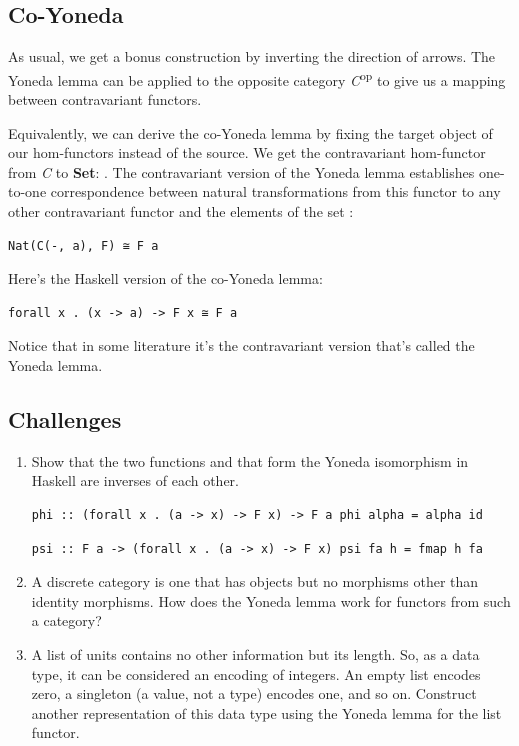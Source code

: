 \subsection{Co-Yoneda}\label{co-yoneda}

As usual, we get a bonus construction by inverting the direction of
arrows. The Yoneda lemma can be applied to the opposite category
\emph{C}\textsuperscript{op} to give us a mapping between contravariant
functors.

Equivalently, we can derive the co-Yoneda lemma by fixing the target
object of our hom-functors instead of the source. We get the
contravariant hom-functor from \emph{C} to \textbf{Set}:
. The contravariant version of the Yoneda lemma
establishes one-to-one correspondence between natural transformations
from this functor to any other contravariant functor  and the
elements of the set :

\begin{verbatim}
Nat(C(-, a), F) ≅ F a
\end{verbatim}

Here's the Haskell version of the co-Yoneda lemma:

\begin{verbatim}
forall x . (x -> a) -> F x ≅ F a
\end{verbatim}

Notice that in some literature it's the contravariant version that's
called the Yoneda lemma.

\subsection{Challenges}\label{challenges}

\begin{enumerate}
\item
  Show that the two functions  and  that form
  the Yoneda isomorphism in Haskell are inverses of each other.

\begin{verbatim}
phi :: (forall x . (a -> x) -> F x) -> F a phi alpha = alpha id
\end{verbatim}

\begin{verbatim}
psi :: F a -> (forall x . (a -> x) -> F x) psi fa h = fmap h fa
\end{verbatim}
\item
  A discrete category is one that has objects but no morphisms other
  than identity morphisms. How does the Yoneda lemma work for functors
  from such a category?
\item
  A list of units \code{{[}(){]}} contains no other information but
  its length. So, as a data type, it can be considered an encoding of
  integers. An empty list encodes zero, a singleton \code{{[}(){]}} (a
  value, not a type) encodes one, and so on. Construct another
  representation of this data type using the Yoneda lemma for the list
  functor.
\end{enumerate}

